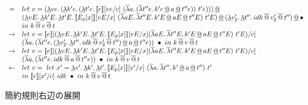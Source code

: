 \begin{figure}[h]
\[\begin{array}{cl}
  = & let\ v =  \DLamP{ve}{\DLamP{k'e}{\DLamP{t'e}{\CPSTh{e}[\Change{c}{ve}]\
              \SLamP{a}{\SLamP{t''e}{k'e \DAppS a \DAppS t''e}}\ t'e}}}\DAppS\\
      & \DLamP{vE}{\DLam{k'E}{\DLam{t'E}{\CPSTh{E_p[x]}[\Change{x}{vE}]\
              \SLamP{aE}{\SLam{t''E}{k'E \DAppS aE \DAppS t''E}}\ t'E}}} \DAppS
                    \DLamP{v_2'}{\DLam{t''}
                      {\SApp{\SApp{idk}{v_2'}}{t''}}}\DAppS{\bullet}\\
                    & in\ k\SAppS v \SAppS t\\

  \to & let\ v = \CPSTh{e}[\Change{c}{\DLamP{vE}{\DLam{k'E}{\DLam{t'E}{\CPSTh{E_p[x]}[\Change{x}{vE}] \SLamP{aE}{\SLam{t''E}{k'E \DAppS aE \DAppS t''E}}\ t'E}}}}]\\
        & \SLamP{a}{\SLamP{t''e}{\DLamP{v_2'}{\DLam{t''}
              {\SApp{\SApp{idk}{v_2'}}{t''}}} \DAppS a \DAppS t''e}}\ \bullet
  \ in\
  k\SAppS v \SAppS t\\

  \to & let\ v = \CPSTh{e}[\Change{c}{\DLamP{vE}{\DLam{k'E}{\DLam{t'E}{\CPSTh{E_p[x]}[\Change{x}{vE}] \SLamP{aE}{\SLam{t''E}{k'E \DAppS aE \DAppS t''E}}\ t'E}}}}]\\
        & \SLamP{a}{\SLamP{t''e}{
              \SApp{\SApp{idk}{a}}{t''e}}}\ \bullet
  \ in\
  k\SAppS v \SAppS t\\

  \leftarrow & let\ v =\ let\ x'=
  \DLam{v'}{\DLam{k'}{\DLam{t'}{\CPSTh{E_p[x]}[\Change{x}{v'}]\
        \SLamP{a}{\SLam{t''}{k' \DAppS a \DAppS t''}}\ t'}}}\ \\
  & in\ \CPSTh{e}[\Change{c}{x'}]\
  idk\ \bullet \ in\ k\SAppS v \SAppS t\\
\end{array}
\]
\caption{簡約規則右辺の展開}
\label{ControlReRight}
\end{figure}
\\
\\
